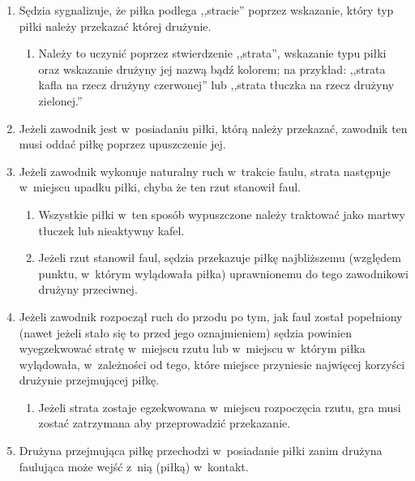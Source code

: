 \documentclass[12pt,a4paper]{article}
\begin{document}
\begin{enumerate}
	\item
	      Sędzia sygnalizuje, że piłka podlega ,,stracie'' poprzez wskazanie,
	      który typ piłki należy przekazać której drużynie.

	      \begin{enumerate}
		      \item
		            Należy to uczynić poprzez stwierdzenie ,,strata'', wskazanie typu
		            piłki oraz wskazanie drużyny jej nazwą bądź kolorem; na przykład:
		            ,,strata kafla na rzecz drużyny czerwonej'' lub ,,strata tłuczka na
		            rzecz drużyny zielonej.''
	      \end{enumerate}
	\item
	      Jeżeli zawodnik jest w~posiadaniu piłki, którą należy przekazać,
	      zawodnik ten musi oddać piłkę poprzez upuszczenie jej.
	\item
	      Jeżeli zawodnik wykonuje naturalny ruch w~trakcie faulu, strata
	      następuje w~miejscu upadku piłki, chyba że ten rzut stanowił faul.

	      \begin{enumerate}
		      \item
		            Wszystkie piłki w~ten sposób wypuszczone należy traktować jako
		            martwy tłuczek lub nieaktywny kafel.
		      \item
		            Jeżeli rzut stanowił faul, sędzia przekazuje piłkę najbliższemu
		            (względem punktu, w~którym wylądowała piłka) uprawnionemu do tego
		            zawodnikowi drużyny przeciwnej.
	      \end{enumerate}
	\item
	      Jeżeli zawodnik rozpoczął ruch do przodu po tym, jak faul
	      został popełniony (nawet jeżeli stało się to przed jego oznajmieniem)
	      sędzia powinien wyegzekwować stratę w~miejscu rzutu lub w~miejscu w~którym piłka wylądowała, w~zależności od tego, które miejsce
	      przyniesie najwięcej korzyści drużynie przejmującej piłkę.

	      \begin{enumerate}
		      \item
		            Jeżeli strata zostaje egzekwowana w~miejscu rozpoczęcia rzutu, gra
		            musi zostać zatrzymana aby przeprowadzić przekazanie.
	      \end{enumerate}
	\item
	      Drużyna przejmująca piłkę przechodzi w~posiadanie piłki zanim drużyna
	      faulująca może wejść z~nią (piłką) w~kontakt.


\end{enumerate}
\end{document}
